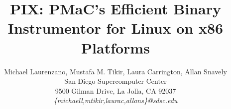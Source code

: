 \documentclass[a4paper,11pt,leqno,notitlepage,onecolumn]{article}
\begin{document}
\title{PIX: PMaC's Efficient Binary Instrumentor for Linux on x86 Platforms}
\author{Michael Laurenzano, Mustafa M. Tikir, Laura Carrington, Allan Snavely\\
San Diego Supercomputer Center\\
9500 Gilman Drive, La Jolla, CA 92037\\
\it{\{michaell,mtikir,laurac,allans\}@sdsc.edu}}
\date{}
\maketitle

\begin{abstract}

\end{abstract}

\label{Section:Introduction}


\label{Section:Overview}


\label{Section:Efficiency}


\label{Section:Results}


\label{Section:Future}


\label{Section:Related}


\label{Section:Conclusions}




\end{document}
